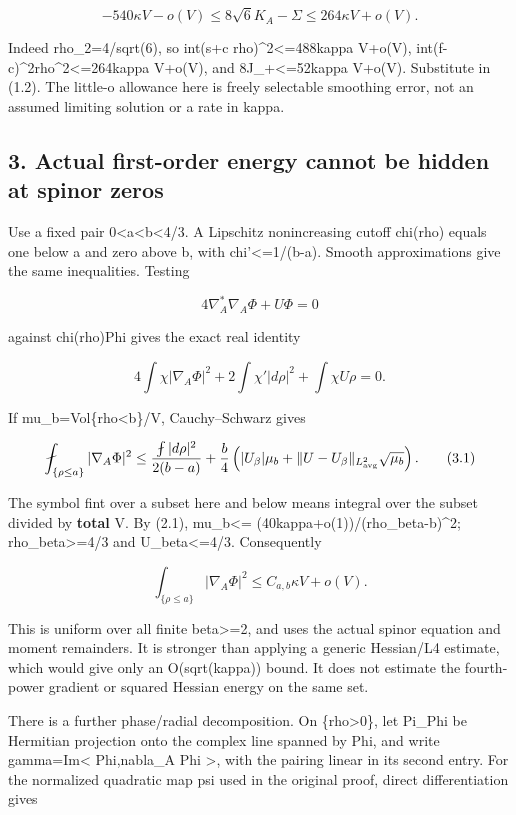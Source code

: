 \documentclass[
  10pt,
]{article}
\begin{document}
\[
 -540\kappa V-o(V)\le8\sqrt6 K_A-\Sigma
 \le264\kappa V+o(V).                                 \tag{2.3}
\]

Indeed rho\_2=4/sqrt(6), so int(s+c rho)\^{}2\textless=488kappa V+o(V),
int(f-c)\^{}2rho\^{}2\textless=264kappa V+o(V), and
8J\_+\textless=52kappa V+o(V). Substitute in (1.2). The little-o
allowance here is freely selectable smoothing error, not an assumed
limiting solution or a rate in kappa.

\hypertarget{actual-first-order-energy-cannot-be-hidden-at-spinor-zeros}{%
\subsection{3. Actual first-order energy cannot be hidden at spinor
zeros}\label{actual-first-order-energy-cannot-be-hidden-at-spinor-zeros}}

Use a fixed pair 0\textless a\textless b\textless4/3. A Lipschitz
nonincreasing cutoff chi(rho) equals one below a and zero above b, with
\textbar chi'\textbar\textless=1/(b-a). Smooth approximations give the
same inequalities. Testing

\[
             4\nabla_A^*\nabla_A\Phi+U\Phi=0
\]

against chi(rho)Phi gives the exact real identity

\[
 4\int\chi|\nabla_A\Phi|^2+
 2\int\chi'|d\rho|^2+\int\chi U\rho=0.
\]

If mu\_b=Vol\{rho\textless b\}/V, Cauchy--Schwarz gives

\[
 \fint_{\{\rho\le a\}}|\nabla_A\Phi|^2
 \le\frac{\fint|d\rho|^2}{2(b-a)}
 +\frac b4\left(|U_\beta|\mu_b+
      \|U-U_\beta\|_{L^2_{\rm avg}}\sqrt{\mu_b}\right). \tag{3.1}
\]

The symbol fint over a subset here and below means integral over the
subset divided by \textbf{total} V. By (2.1), mu\_b\textless=
(40kappa+o(1))/(rho\_beta-b)\^{}2; rho\_beta\textgreater=4/3 and
\textbar U\_beta\textbar\textless=4/3. Consequently

\[
 \boxed{\int_{\{\rho\le a\}}|\nabla_A\Phi|^2
             \le C_{a,b}\kappa V+o(V).}                \tag{3.2}
\]

This is uniform over all finite beta\textgreater=2, and uses the actual
spinor equation and moment remainders. It is stronger than applying a
generic Hessian/L4 estimate, which would give only an O(sqrt(kappa))
bound. It does not estimate the fourth-power gradient or squared Hessian
energy on the same set.

There is a further phase/radial decomposition. On \{rho\textgreater0\},
let Pi\_Phi be Hermitian projection onto the complex line spanned by
Phi, and write gamma=Im\textless{} Phi,nabla\_A Phi \textgreater, with
the pairing linear in its second entry. For the normalized quadratic map
psi used in the original proof, direct differentiation gives
\end{document}
